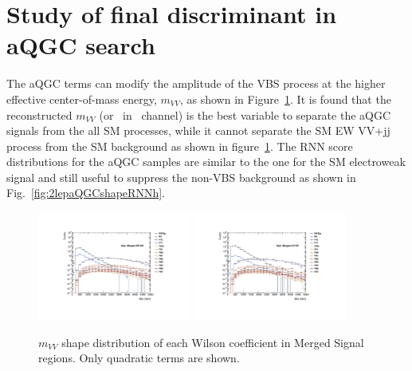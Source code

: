 \section{Study of final discriminant in aQGC search}
\label{subsec:2binapproach}
The aQGC terms can modify the amplitude of the VBS process at the higher effective center-of-mass energy, $m_{VV}$, as shown in Figure~\ref{fig:2lepaQGCshapeMVVh}.
It is found that the reconstructed $m_{VV}$ (or \mt\ in \zlep\ channel) is the best variable to separate the aQGC signals from the all SM processes, while it cannot separate the SM EW VV+jj process from the SM background as shown in figure~\ref{fig:2lepaQGCshapeMVVh}.
The RNN score distributions for the aQGC samples are similar to the one for the SM electroweak signal and still useful to suppress the non-VBS background as shown in Fig.~\ref{fig:2lepaQGCshapeRNNh}.
\begin{figure}[]
    \centering
   \includegraphics[width=0.45\textwidth]{figures/aQGC/MllJ_SR_HP_aQGC.pdf}
   \includegraphics[width=0.45\textwidth]{figures/aQGC/MllJ_SR_LP_aQGC.pdf}
    \caption{$m_{VV}$ shape distribution of each Wilson coefficient in Merged Signal regions. Only quadratic terms are shown.}
    \label{fig:2lepaQGCshapeMVVh}
\end{figure}
